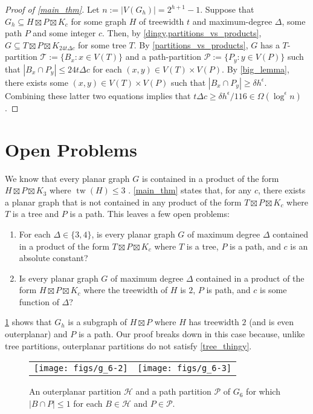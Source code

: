 \documentclass{patmorin}
\DeclareMathOperator{\tw}{tw}
\renewcommand{\le}{\leqslant}
\renewcommand{\ge}{\geqslant}
\begin{document}
\begin{proof}[Proof of \cref{main_thm}]
  Let $n:=|V(G_h)|=2^{h+1}-1$.  Suppose that $G_h\subseteq H\boxtimes P\boxtimes K_c$ for some graph $H$ of treewidth $t$ and maximum-degree $\Delta$, some path $P$ and some integer $c$.  Then, by \cref{dingy,partitions_vs_products}, $G\subseteq T\boxtimes P\boxtimes K_{24t\Delta c}$ for some tree $T$.  By \cref{partitions_vs_products}, $G$ has a $T$-partition $\mathcal{T}:=\{B_x:x\in V(T)\}$ and a path-partition $\mathcal{P}:=\{P_y:y\in V(P)\}$ such that $|B_x\cap P_y|\le 24t\Delta c$ for each $(x,y)\in V(T)\times V(P)$.  By \cref{big_lemma}, there exists some $(x,y)\in V(T)\times V(P)$ such that $|B_x\cap P_y| \ge \delta h^\epsilon$.  Combining these latter two equations implies that $t\Delta c\ge \delta h^\epsilon/116 \in \Omega(\log^\epsilon n)$.
\end{proof}



\section{Open Problems}

We know that every planar graph $G$ is contained in a product of the form $H\boxtimes P\boxtimes K_3$ where $\tw(H)\le 3$ \cite{dujmovic.joret.ea:planar}. \cref{main_thm} states that, for any $c$, there exists a planar graph that is not contained in any product of the form $T\boxtimes P\boxtimes K_c$ where $T$ is a tree and $P$ is a path.  This leaves a few open problems:

\begin{enumerate}
  \item For each $\Delta\in\{3,4\}$, is every planar graph $G$ of maximum degree $\Delta$ contained in a product of the form $T\boxtimes P\boxtimes K_c$ where $T$ is a tree, $P$ is a path, and $c$ is an absolute constant?

  \item Is every planar graph $G$ of maximum degree $\Delta$ contained in a product of the form $H\boxtimes P\boxtimes K_c$ where the treewidth of $H$ is $2$, $P$ is path, and $c$ is some function of $\Delta$?
\end{enumerate}

\cref{two_tree} shows that $G_h$ is a subgraph of $H\boxtimes P$ where $H$ has treewidth $2$ (and is even outerplanar) and $P$ is a path. Our proof breaks down in this case because, unlike tree partitions, outerplanar partitions do not satisfy \cref{tree_thingy}.

\begin{figure}
  \begin{center}
    \begin{tabular}{cc}
      \texttt{[image: figs/g\_6-2]} & \texttt{[image: figs/g\_6-3]}
    \end{tabular}
  \end{center}
  \caption{An outerplanar partition $\mathcal{H}$ and a path partition $\mathcal{P}$ of $G_6$ for which $|B\cap P|\le 1$ for each $B\in\mathcal{H}$ and $P\in\mathcal{P}$.}
  \label{two_tree}
\end{figure}



\end{document}
